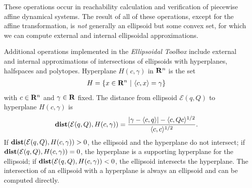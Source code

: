 \documentclass[letterpaper,10pt,english]{sphinxmanual}
\begin{document}
These operations occur in reachability calculation and verification of
piecewise affine dynamical systems. The result of all of these
operations, except for the affine transformation, is \emph{not} generally an
ellipsoid but some convex set, for which we can compute external and
internal ellipsoidal approximations.

Additional operations implemented in the \emph{Ellipsoidal Toolbox} include
external and internal approximations of intersections of ellipsoids with
hyperplanes, halfspaces and polytopes. Hyperplane $H(c,\gamma)$ in
${\bf R}^n$ is the set
\label{main_source:equation-hyperplane}\begin{gather}
\begin{split}H = \{x\in{\bf R}^n ~|~ \langle c, x\rangle = \gamma\}\end{split}\label{main_source-hyperplane}
\end{gather}
with $c\in{\bf R}^n$ and $\gamma\in{\bf R}$ fixed.
The distance from ellipsoid ${\mathcal E}(q,Q)$ to
hyperplane $H(c,\gamma)$ is
\label{main_source:equation-dist_hp}\begin{gather}
\begin{split}{\bf dist}({\mathcal E}(q,Q),H(c,\gamma)) =
\frac{\left|\gamma-\langle c,q\rangle\right| -
\langle c,Qc\rangle^{1/2}}{\langle c,c\rangle^{1/2}}.\end{split}\label{main_source-dist_hp}
\end{gather}
If ${\bf dist}({\mathcal E}(q,Q),H(c,\gamma))>0$, the ellipsoid
and the hyperplane do not intersect; if
${\bf dist}({\mathcal E}(q,Q),H(c,\gamma))=0$, the hyperplane is a
supporting hyperplane for the ellipsoid; if
${\bf dist}({\mathcal E}(q,Q),H(c,\gamma))<0$, the ellipsoid
intersects the hyperplane. The intersection of an ellipsoid with a
hyperplane is always an ellipsoid and can be computed directly.
\end{document}
